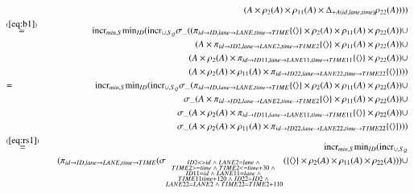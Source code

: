 \documentclass{article}
\newcommand{\tuple}[1]{{\langle#1\rangle}}
\begin{document}
\begin{eqnarray*}
\\&&\quad
( A \times \rho_{2}(A) \times \rho_{11}(A) \times \Delta_{+A(id, lane, time)}\rho_{22}(A))
))
\\
%
&\stackrel{(\ref{eq:b1})}{=}&
\algincr_{min, S} \algmin_{ID} (\algincr_{\cup, S_Q} \sigma_{\dots} (
(\pi_{id \rightarrow ID, lane \rightarrow LANE, time \rightarrow TIME}\{\tuple{}\} \times \rho_{2}(A) \times \rho_{11}(A) \times \rho_{22}(A))\cup
\\&&\quad 
( A \times \pi_{id \rightarrow ID2, lane \rightarrow LANE2, time \rightarrow TIME2}\{\tuple{}\} \times \rho_{11}(A) \times \rho_{22}(A))\cup
\\&&\quad
( A \times \rho_{2}(A) \times \pi_{id \rightarrow ID11, lane \rightarrow LANE11, time \rightarrow TIME11}\{\tuple{}\} \times \rho_{22}(A))\cup
\\&&\quad
( A \times \rho_{2}(A) \times \rho_{11}(A) \times \pi_{id \rightarrow ID22, lane \rightarrow LANE22, time \rightarrow TIME22}\{\tuple{}\})
))
\\
%
&=&
\algincr_{min, S} \algmin_{ID} (\algincr_{\cup, S_Q} \sigma_{\dots}
(\pi_{id \rightarrow ID, lane \rightarrow LANE, time \rightarrow TIME}\{\tuple{}\} \times \rho_{2}(A) \times \rho_{11}(A) \times \rho_{22}(A))\cup
\\&&\quad 
\sigma_{\dots}( A \times \pi_{id \rightarrow ID2, lane \rightarrow LANE2, time \rightarrow TIME2}\{\tuple{}\} \times \rho_{11}(A) \times \rho_{22}(A))\cup
\\&&\quad
\sigma_{\dots}( A \times \rho_{2}(A) \times \pi_{id \rightarrow ID11, lane \rightarrow LANE11, time \rightarrow TIME11}\{\tuple{}\} \times \rho_{22}(A))\cup
\\&&\quad
\sigma_{\dots}( A \times \rho_{2}(A) \times \rho_{11}(A) \times \pi_{id \rightarrow ID22, lane \rightarrow LANE22, time \rightarrow TIME22}\{\tuple{}\})
))
\\
%
&\stackrel{(\ref{eq:rs1})}{=}&
\algincr_{min, S} \algmin_{ID} (\algincr_{\cup, S_Q} 
\\&&\quad
(\pi_{id \rightarrow ID, lane \rightarrow LANE, time \rightarrow TIME} 
(\sigma_{\substack{ID2 <> id \;\wedge\; LANE2 = lane \;\wedge\;\\ TIME2 >= time \;\wedge\; TIME2 <= time + 30 \;\wedge\; \\ID11 = id \;\wedge\; LANE11 = lane \;\wedge\; \\TIME11 time + 120 \;\wedge\; ID22 = ID2 \;\wedge\;\\ LANE22 = LANE2 \;\wedge\; TIME22 = TIME2 + 110}} 
(\{\tuple{}\}\times \rho_{2}(A) \times \rho_{11}(A) \times \rho_{22}(A)))\cup

\end{eqnarray*}
\end{document}
